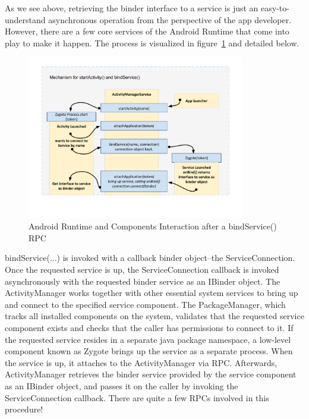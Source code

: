 \documentclass[prodmode]{acmlarge}
\begin{document}
As we see above, retrieving the binder interface to a service is just an easy-to-understand asynchronous operation from the perspective of the app developer. However, there are a few core services of the Android Runtime that come into play to make it happen. The process is visualized in figure~\ref{fig:BindService} and detailed below.

\begin{figure}[h]
\centering
\includegraphics[width=0.85\textwidth]{drawings/bindService.pdf}
\caption{Android Runtime and Components Interaction after a bindService() RPC}
\label{fig:BindService}
\end{figure}

bindService(...) is invoked with a callback binder object--the ServiceConnection. Once the requested service is up, the ServiceConnection callback is invoked asynchronously with the requested binder service as an IBinder object. The ActivityManager works together with other essential system services to bring up and connect to the specified service component. The PackageManager, which tracks all installed components on the system, validates that the requested service component exists and checks that the caller has permissions to connect to it. If the requested service resides in a separate java package namespace, a low-level component known as Zygote brings up the service as a separate process. When the service is up, it attaches to the ActivityManager via RPC. Afterwards, ActivityManager retrieves the binder service provided by the service component as an IBinder object, and passes it on the caller by invoking the ServiceConnection callback. There are quite a few RPCs involved in this procedure!
\end{document}
